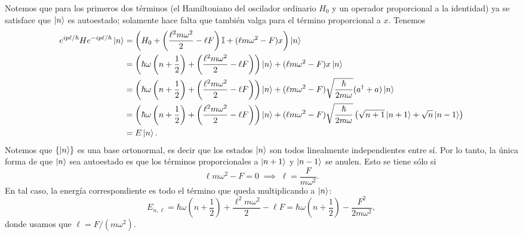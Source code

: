 \documentclass[10pt, a4paper]{article}
\newcommand{\xprefactsq}{\frac{\hbar}{2m\omega}}
\newcommand{\xprefact}{\sqrt{\xprefactsq}}
\numberwithin{equation}{subsection}
\begin{document}
Notemos que para los primeros dos términos (el Hamiltoniano del oscilador
ordinario $H_0$ y un operador proporcional a la identidad) ya se satisface que
$\ket{n}$ es autoestado; solamente hace falta que también valga para el término
proporcional a $x$. Tenemos
\begin{align}
  e^{ip\ell/\hbar}He^{-ip\ell/\hbar}\ket{n} &= \left(H_0 +
    \left(\frac{\ell^2m\omega^2}{2} - \ell F\right)\Id + (\ell m\omega^2 -
    F)x\right)\ket{n} \\
  &= \left(\hbar\omega\left(n + \frac{1}{2}\right) +
    \left(\frac{\ell^2m\omega^2}{2} - \ell F\right)\right)\ket{n} + (\ell
     m\omega^2 - F)x\ket{n} \\
  &= \left(\hbar\omega\left(n + \frac{1}{2}\right) +
    \left(\frac{\ell^2m\omega^2}{2} - \ell F\right)\right)\ket{n} + (\ell
    m\omega^2 - F) \xprefact(a^\dagger + a)\ket{n} \\
  &= \left(\hbar\omega\left(n + \frac{1}{2}\right) +
    \left(\frac{\ell^2m\omega^2}{2} - \ell F\right)\right)\ket{n} + (\ell
    m\omega^2 - F) \xprefact\left(\sqrt{n+1}\ket{n+1} +
    \sqrt{n}\ket{n-1}\right) \\
  &= E\ket{n}.
\end{align}
Notemos que $\set{\ket{n}}$ es una base ortonormal, es decir que los estados
$\ket{n}$ son todos linealmente independientes entre sí. Por lo tanto, la única
forma de que $\ket{n}$ sea autoestado es que los términos proporcionales a
$\ket{n+1}$ y $\ket{n-1}$ se anulen. Esto se tiene sólo si
\begin{equation}
  \ell m\omega^2 - F = 0 \;\implies\;
  \ell = \frac{F}{m\omega^2}.
\end{equation}
En tal caso, la energía correspondiente es todo el término que queda
multiplicando a $\ket{n}$:
\begin{equation}
  E_{n,\ell} = \hbar\omega\left(n + \frac{1}{2}\right) +
    \frac{\ell^2m\omega^2}{2} - \ell F = \hbar\omega\left(n +
    \frac{1}{2}\right) - \frac{F^2}{2m\omega^2},
\end{equation}
donde usamos que $\ell = F / (m\omega^2)$.

\bigbreak
\end{document}
